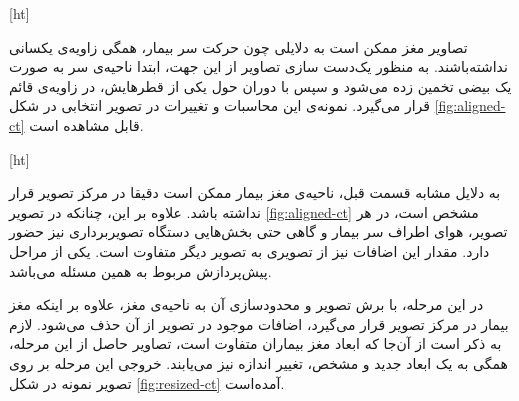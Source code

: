 
[ht]
    
تصاویر مغز ممکن است به دلایلی چون حرکت سر بیمار، همگی زاویه‌ی یکسانی نداشته‌باشند.
به منظور یک‌دست سازی تصاویر از این جهت، ابتدا ناحیه‌ی سر به صورت یک بیضی تخمین زده می‌شود و سپس با دوران حول یکی از قطر‌هایش، در زاویه‌ی قائم قرار می‌گیرد.
نمونه‌ی این محاسبات و تغییرات در تصویر انتخابی در شکل \ref{fig:aligned-ct}
قابل مشاهده است.


[ht]

به دلایل مشابه قسمت قبل، ناحیه‌ی مغز بیمار ممکن است دقیقا در مرکز تصویر قرار نداشته باشد.
علاوه بر این، چنانکه در تصویر \ref{fig:aligned-ct} مشخص است، 
در هر تصویر، هوای اطراف سر بیمار و گاهی حتی بخش‌هایی دستگاه تصویربرداری نیز حضور دارد.
مقدار این اضافات نیز از تصویری به تصویر دیگر متفاوت است.
یکی از مراحل پیش‌پردازش مربوط به همین مسئله می‌باشد.

در این مرحله،
با برش تصویر و محدودسازی آن به ناحیه‌ی مغز،
علاوه بر اینکه مغز بیمار در مرکز تصویر قرار می‌گیرد، اضافات موجود در تصویر از آن حذف می‌شود.
لازم به ذکر است از آن‌جا که ابعاد مغز بیماران متفاوت است، تصاویر حاصل از این مرحله، همگی به یک ابعاد جدید و مشخص، تغییر اندازه نیز می‌یابند.
خروجی این مرحله بر روی تصویر نمونه در شکل 
\ref{fig:resized-ct}
آمده‌است.


